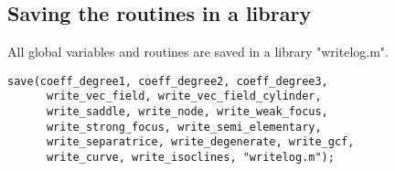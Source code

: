 \documentclass[a4paper,10pt]{article}
\begin{document}
\subsection{Saving the routines in a library}

All global variables and routines are saved in a library "writelog.m".

\begin{lstlisting}[name=writelog]
save(coeff_degree1, coeff_degree2, coeff_degree3,
      write_vec_field, write_vec_field_cylinder,
      write_saddle, write_node, write_weak_focus,
      write_strong_focus, write_semi_elementary,
      write_separatrice, write_degenerate, write_gcf,
      write_curve, write_isoclines, "writelog.m");
\end{lstlisting}
\end{document}
